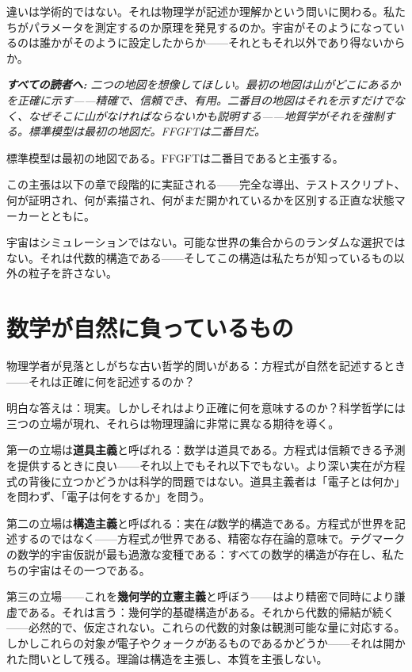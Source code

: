 \documentclass[11pt,openany]{book}
\newenvironment{laierspur}{%
  \par\vspace{4pt}%
  \noindent\small\itshape\color{blue!60!black}%
  \textbf{すべての読者へ:}\enspace\ignorespaces}{%
  \par\vspace{4pt}\normalsize\normalfont\normalcolor}
\begin{document}
違いは学術的ではない。それは物理学が記述か理解かという問いに関わる。私たちがパラメータを測定するのか原理を発見するのか。宇宙がそのようになっているのは誰かがそのように設定したからか——それともそれ以外であり得ないからか。

\begin{laierspur}
二つの地図を想像してほしい。最初の地図は山がどこにあるかを正確に示す——精確で、信頼でき、有用。二番目の地図はそれを示すだけでなく、なぜそこに山がなければならないかも説明する——地質学がそれを強制する。標準模型は最初の地図だ。FFGFTは二番目だ。
\end{laierspur}

標準模型は最初の地図である。FFGFTは二番目であると主張する。

この主張は以下の章で段階的に実証される——完全な導出、テストスクリプト、何が証明され、何が素描され、何がまだ開かれているかを区別する正直な状態マーカーとともに。

宇宙はシミュレーションではない。可能な世界の集合からのランダムな選択ではない。それは代数的構造である——そしてこの構造は私たちが知っているもの以外の粒子を許さない。

\medskip

\chapter{数学が自然に負っているもの}

物理学者が見落としがちな古い哲学的問いがある：方程式が自然を記述するとき——それは正確に何を記述するのか？

明白な答えは：現実。しかしそれはより正確に何を意味するのか？科学哲学には三つの立場が現れ、それらは物理理論に非常に異なる期待を導く。

第一の立場は\textbf{道具主義}と呼ばれる：数学は道具である。方程式は信頼できる予測を提供するときに良い——それ以上でもそれ以下でもない。より深い実在が方程式の背後に立つかどうかは科学的問題ではない。道具主義者は「電子とは何か」を問わず、「電子は何をするか」を問う。

第二の立場は\textbf{構造主義}と呼ばれる：実在\textit{は}数学的構造である。方程式が世界を記述するのではなく——方程式\textit{が}世界である、精密な存在論的意味で。テグマークの数学的宇宙仮説が最も過激な変種である：すべての数学的構造が存在し、私たちの宇宙はその一つである。

第三の立場——これを\textbf{幾何学的立憲主義}と呼ぼう——はより精密で同時により謙虚である。それは言う：幾何学的基礎構造がある。それから代数的帰結が続く——必然的で、仮定されない。これらの代数的対象は観測可能な量に対応する。しかしこれらの対象\textit{が}電子やクォーク\textit{が}あるものであるかどうか——それは開かれた問いとして残る。理論は構造を主張し、本質を主張しない。
\end{document}
